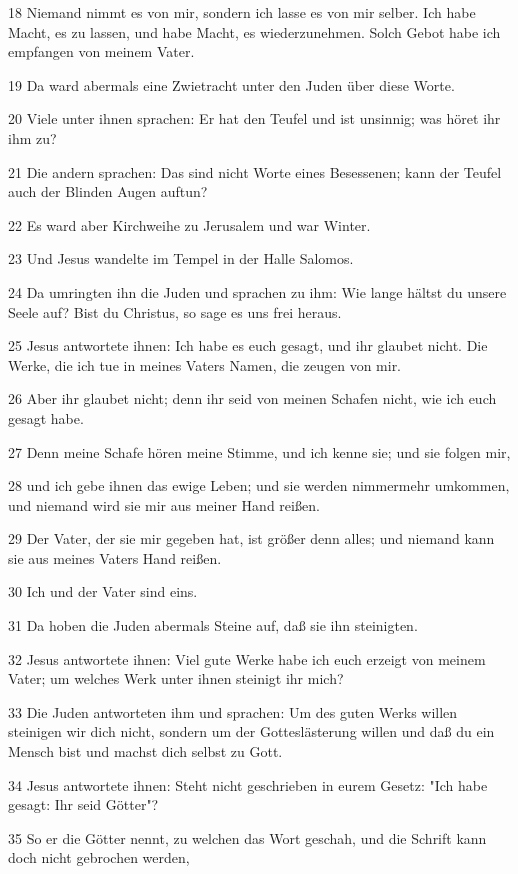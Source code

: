 \par 18 Niemand nimmt es von mir, sondern ich lasse es von mir selber. Ich habe Macht, es zu lassen, und habe Macht, es wiederzunehmen. Solch Gebot habe ich empfangen von meinem Vater.
\par 19 Da ward abermals eine Zwietracht unter den Juden über diese Worte.
\par 20 Viele unter ihnen sprachen: Er hat den Teufel und ist unsinnig; was höret ihr ihm zu?
\par 21 Die andern sprachen: Das sind nicht Worte eines Besessenen; kann der Teufel auch der Blinden Augen auftun?
\par 22 Es ward aber Kirchweihe zu Jerusalem und war Winter.
\par 23 Und Jesus wandelte im Tempel in der Halle Salomos.
\par 24 Da umringten ihn die Juden und sprachen zu ihm: Wie lange hältst du unsere Seele auf? Bist du Christus, so sage es uns frei heraus.
\par 25 Jesus antwortete ihnen: Ich habe es euch gesagt, und ihr glaubet nicht. Die Werke, die ich tue in meines Vaters Namen, die zeugen von mir.
\par 26 Aber ihr glaubet nicht; denn ihr seid von meinen Schafen nicht, wie ich euch gesagt habe.
\par 27 Denn meine Schafe hören meine Stimme, und ich kenne sie; und sie folgen mir,
\par 28 und ich gebe ihnen das ewige Leben; und sie werden nimmermehr umkommen, und niemand wird sie mir aus meiner Hand reißen.
\par 29 Der Vater, der sie mir gegeben hat, ist größer denn alles; und niemand kann sie aus meines Vaters Hand reißen.
\par 30 Ich und der Vater sind eins.
\par 31 Da hoben die Juden abermals Steine auf, daß sie ihn steinigten.
\par 32 Jesus antwortete ihnen: Viel gute Werke habe ich euch erzeigt von meinem Vater; um welches Werk unter ihnen steinigt ihr mich?
\par 33 Die Juden antworteten ihm und sprachen: Um des guten Werks willen steinigen wir dich nicht, sondern um der Gotteslästerung willen und daß du ein Mensch bist und machst dich selbst zu Gott.
\par 34 Jesus antwortete ihnen: Steht nicht geschrieben in eurem Gesetz: "Ich habe gesagt: Ihr seid Götter"?
\par 35 So er die Götter nennt, zu welchen das Wort geschah, und die Schrift kann doch nicht gebrochen werden,

